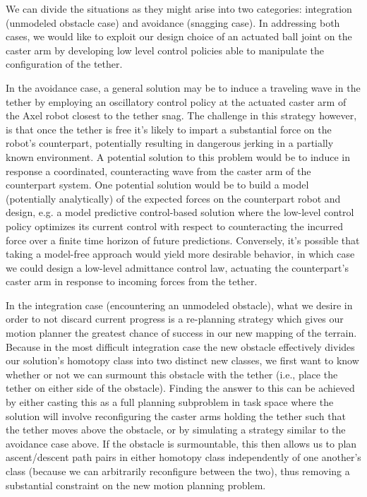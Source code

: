 \documentclass[12pt]{article}
\begin{document}
We can divide the situations as they might arise into two categories: integration (unmodeled obstacle case) 
and avoidance (snagging case). In addressing both cases, we would like to exploit our design choice of an 
actuated ball joint on the caster arm by developing low level control policies able to manipulate the 
configuration of the tether. 

In the avoidance case, a general solution may be to induce a traveling wave in the tether by employing 
an oscillatory control policy at the actuated caster arm of the Axel robot closest to the tether snag. 
The challenge in this strategy however, is that once the tether is free it's likely to impart a substantial 
force on the robot's counterpart, potentially resulting in dangerous jerking in a partially known environment. 
A potential solution to this problem would be to induce in response a coordinated, counteracting wave from the caster 
arm of the counterpart system. One potential solution would be to build a model (potentially analytically)
of the expected forces on the counterpart robot and design, e.g. a model predictive control-based solution where 
the low-level control policy optimizes its current control with respect to counteracting the incurred force over 
a finite time horizon of future predictions. Conversely, it's possible that taking a model-free approach would 
yield more desirable behavior, in which case we could design a low-level admittance control law, actuating 
the counterpart's caster arm in response to incoming forces from the tether.

In the integration case (encountering an unmodeled obstacle), what we desire in order to not discard current 
progress is a re-planning strategy which gives our motion planner the greatest chance of success in 
our new mapping of the terrain. Because in the most 
difficult integration case the new obstacle effectively divides our solution's homotopy class into two distinct 
new classes, we first want to know whether or not we can surmount this obstacle with the tether (i.e., place the 
tether on either side of the obstacle). Finding the answer to this can be achieved by either casting this as a 
full planning subproblem in task space where the solution will involve reconfiguring the caster arms holding the 
tether such that the tether moves above the obstacle, or by simulating a strategy similar to the avoidance case above. 
If the obstacle is surmountable, this then allows us to plan ascent/descent path pairs in either 
homotopy class independently of one another's class (because we can arbitrarily reconfigure between the two), thus 
removing a substantial constraint on the new motion planning problem.
\end{document}
